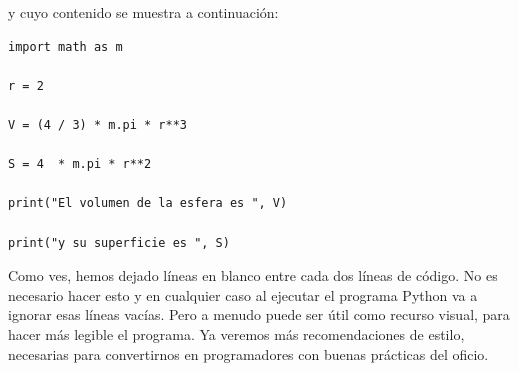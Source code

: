 \documentclass[10pt,a4paper]{article}\usepackage[]{graphicx}\usepackage[]{color}
\makeatletter
\newenvironment{kframe}{%
 \def\at@end@of@kframe{}%
 \ifinner\ifhmode%
  \def\at@end@of@kframe{\end{minipage}}%
  \begin{minipage}{\columnwidth}%
 \fi\fi%
 \def\FrameCommand##1{\hskip\@totalleftmargin \hskip-\fboxsep
 \colorbox{shadecolor}{##1}\hskip-\fboxsep
     \hskip-\linewidth \hskip-\@totalleftmargin \hskip\columnwidth}%
 \MakeFramed {\advance\hsize-\width
   \@totalleftmargin\z@ \linewidth\hsize
   \@setminipage}}%
 {\par\unskip\endMakeFramed%
 \at@end@of@kframe}
\newenvironment{knitrout}{}{} %
\newcounter {cont01}
\makeatother
\begin{document}
\begin{center}
\end{center}
y cuyo contenido se muestra a continuación:
\begin{knitrout}
\color{fgcolor}\begin{kframe}
\begin{verbatim}
import math as m 

r = 2

V = (4 / 3) * m.pi * r**3

S = 4  * m.pi * r**2

print("El volumen de la esfera es ", V)

print("y su superficie es ", S)
\end{verbatim}
\end{kframe}
\end{knitrout}
Como ves, hemos dejado líneas en blanco entre cada dos líneas de código. No es necesario hacer esto y en cualquier caso al ejecutar el programa Python va a ignorar esas líneas vacías. Pero a menudo puede ser útil como recurso visual, para hacer más legible el programa. Ya veremos más recomendaciones de estilo, necesarias para convertirnos en programadores con buenas prácticas del oficio.
\end{document}
